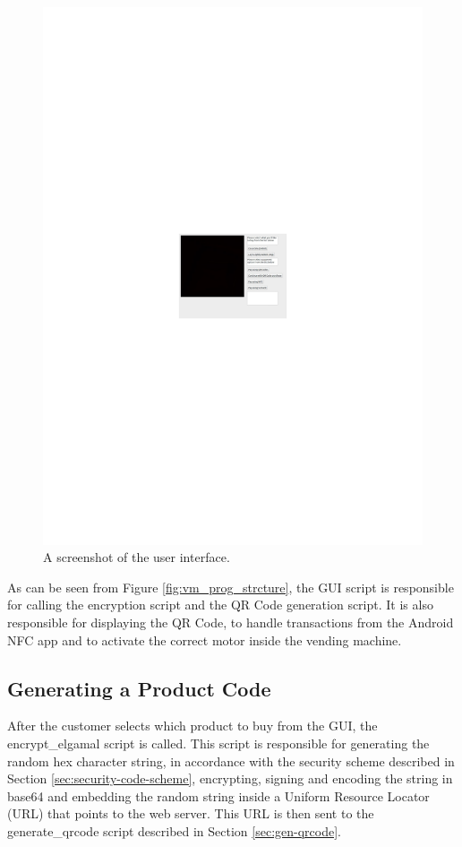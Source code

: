 \begin{figure}
 \centering 
 \includegraphics[scale=0.4]{gui_screenshot}
 \caption{A screenshot of the user interface.}
 \label{fig:gui-screenshot}
\end{figure}

As can be seen from Figure \ref{fig:vm_prog_strcture}, the GUI script is
responsible for calling the encryption script and the QR Code generation script.
It is also responsible for displaying the QR Code, to handle transactions from
the Android NFC app and to activate the correct motor inside the vending
machine. 

\subsection{Generating a Product Code}

After the customer selects which product to buy from the GUI, the
encrypt\_elgamal script is called. This script is responsible for generating the
random hex character string, in accordance with the security scheme described in
Section \ref{sec:security-code-scheme}, encrypting, signing and encoding the
string in base64 and embedding the random string inside a Uniform
Resource Locator (URL) that points to the web server. This URL is then sent to
the generate\_qrcode script described in Section \ref{sec:gen-qrcode}.

